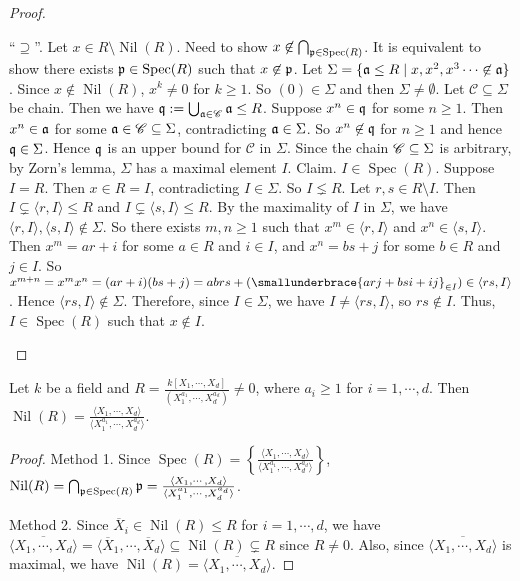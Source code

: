 \begin{proof}
\begin{enumerate}
            ``$\supseteq$''. Let $x \in R \setminus \operatorname{Nil}(R)$. Need to show $x \not \in \bigcap_{\mathfrak{p} \in \operatorname{Spec}(R)}$. It is equivalent to show there exists $\mathfrak{p} \in \operatorname{Spec}(R)$ such that $x \not \in \mathfrak{p}$. Let $\Sigma = \{\mathfrak{a} \leq R \mid x,x^2,x^3 \cdots \not \in \mathfrak{a}\}$. Since $x \not \in \operatorname{Nil}(R)$, $x^k \neq 0$ for $k \geq 1$. So $(0) \in \Sigma$ and then $\Sigma \neq \emptyset$. Let $\mathscr C \subseteq \Sigma$ be chain. Then we have $\mathfrak{q} := \bigcup_{\mathfrak{a} \in \mathscr C} \mathfrak{a} \leq R$. Suppose $x^n \in \mathfrak{q}$ for some $n \geq 1$. Then $x^n \in \mathfrak{a}$ for some $\mathfrak{a} \in \mathscr C \subseteq \Sigma$, contradicting $\mathfrak{a} \in \Sigma$. So $x^n \not \in \mathfrak{q}$ for $n \geq 1$ and hence $\mathfrak{q} \in \Sigma$. Hence $\mathfrak{q}$ is an upper bound for $\mathscr C$ in $\Sigma$. Since the chain $\mathscr{C} \subseteq \Sigma$ is arbitrary, by Zorn's lemma, $\Sigma$ has a maximal element $I$. Claim. $I \in \operatorname{Spec}(R)$. Suppose $I = R$. Then $x \in R = I$, contradicting $I \in \Sigma$. So $I \lneq R$. Let $r,s \in R \setminus I$. Then $I \subsetneq \langle r,I \rangle \leq R$ and $I \subsetneq \langle s,I \rangle \leq R$. By the maximality of $I$ in $\Sigma$, we have $\langle r,I \rangle, \langle s,I \rangle \not \in \Sigma$. So there exists $m,n \geq 1$ such that $x^m \in \langle r,I \rangle$ and $x^n \in \langle s,I \rangle$. Then $x^m = ar+i$ for some $a \in R$ and $i \in I$, and $x^n = bs + j$ for some $b \in R$ and $j \in I$. So $x^{m+n} = x^m x^n = (ar+i)(bs+j) = abrs + (\smallunderbrace{arj+bsi+ij}_{\in I}) \in \langle rs,I \rangle$. Hence $\langle rs, I \rangle \not\in \Sigma$. Therefore, since $I \in \Sigma$, we have $I \neq \langle rs,I \rangle$, so $rs \not \in I$. Thus, $I \in \operatorname{Spec}(R)$ such that $x \not \in I$. \qedhere
    \end{enumerate}
\end{proof}

\begin{example*}
    Let $k$ be a field and $R = \frac{k[X_1,\cdots,X_d]}{(X_1^{a_1},\cdots,X_d^{a_d})} \neq 0$, where $a_i \geq 1$ for $i = 1,\cdots,d$. Then $\operatorname{Nil}(R) = \frac{\langle X_1,\cdots,X_d \rangle}{\langle X_1^{a_1},\cdots,X_d^{a_d} \rangle}$.
\end{example*}

\begin{proof}
    Method 1. Since $\operatorname{Spec}(R) = \left\{\frac{\langle X_1,\cdots,X_d \rangle}{\langle X_1^{a_1},\cdots,X_d^{a_d} \rangle}\right\}$, $\operatorname{Nil}(R) = \bigcap_{\mathfrak{p} \in \operatorname{Spec}(R)} \mathfrak{p} =  \frac{\langle X_1,\cdots,X_d \rangle}{\langle X_1^{a_1},\cdots,X_d^{a_d} \rangle}$. \par
    Method 2. Since $\overbar X_i \in \operatorname{Nil}(R) \leq R$ for $i = 1,\cdots,d$, we have $\overbar {\langle X_1,\cdots,X_d \rangle} = \langle \overbar X_1,\cdots,\overbar X_d \rangle \subseteq \operatorname{Nil}(R) \subsetneq R$ since $R \neq 0$. Also, since $\overbar {\langle X_1,\cdots,X_d \rangle}$ is maximal, we have $\operatorname{Nil}(R) = \overbar {\langle X_1,\cdots,X_d \rangle}$.
\end{proof}

